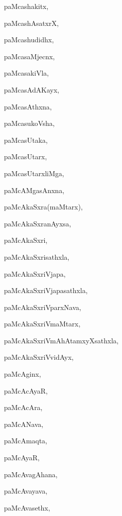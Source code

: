 \begin{multicols}{2}
{paMcashakitx}, \pageref{paMcashakitx}

{paMcashAsatxrX}, \pageref{paMcashAsatxrX}

{paMcashudidhx}, \pageref{paMcashudidhx}

{paMcasaMjecnx}, \pageref{paMcasaMjecnx}

{paMcasakiVla}, \pageref{paMcasakiVla}

{paMcasAdAKayx}, \pageref{paMcasAdAKayx}

{paMcasAthxna}, \pageref{paMcasAthxna}

{paMcasukoVsha}, \pageref{paMcasukoVsha}

{paMcasUtaka}, \pageref{paMcasUtaka}

{paMcasUtarx}, \pageref{paMcasUtarx}

{paMcasUtarxliMga}, \pageref{paMcasUtarxliMga}

{paMcAMgasAnxna}, \pageref{paMcAMgasAnxna}

{paMcAkaSxra(maMtarx)}, \pageref{paMcAkaSxramaMtarx}

{paMcAkaSxranAyxsa}, \pageref{paMcAkaSxranAyxsa}

{paMcAkaSxri}, \pageref{paMcAkaSxri}

{paMcAkaSxrisathxla}, \pageref{paMcAkaSxrisathxla}

{paMcAkaSxriVjapa}, \pageref{paMcAkaSxriVjapa}

{paMcAkaSxriVjapasathxla}, \pageref{paMcAkaSxriVjapasathxla}

{paMcAkaSxriVparxNava}, \pageref{paMcAkaSxriVparxNava}

{paMcAkaSxriVmaMtarx}, \pageref{paMcAkaSxriVmaMtarx}

{paMcAkaSxriVmAhAtamxyXsathxla}, \pageref{paMcAkaSxriVmAhAtamxyXsathxla}

{paMcAkaSxriVvidAyx}, \pageref{paMcAkaSxriVvidAyx}

{paMcAginx}, \pageref{paMcAginx}

{paMcAcAyaR}, \pageref{paMcAcAyaR}

{paMcAcAra}, \pageref{paMcAcAra}

{paMcANava}, \pageref{paMcANava}

{paMcAmaqta}, \pageref{paMcAmaqta}

{paMcAyaR}, \pageref{paMcAyaR}

{paMcAvagAhana}, \pageref{paMcAvagAhana}

{paMcAvayava}, \pageref{paMcAvayava}

{paMcAvasethx}, \pageref{paMcAvasethx}


\end{multicols}
